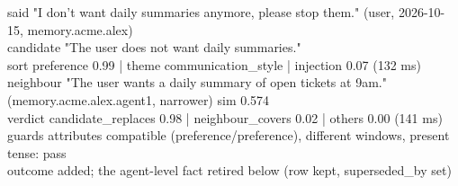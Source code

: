 \begin{tcolorbox}[enhanced,colback=titlebg,colframe=rule,arc=4pt,boxrule=0.4pt,left=6pt,right=6pt,top=4pt,bottom=4pt,
  title={\sffamily\footnotesize\bfseries An insert trace (abridged), from the organisational probe},coltitle=ink,colbacktitle=titlebg]
\footnotesize\ttfamily
said       "I don't want daily summaries anymore, please stop them."   (user, 2026-10-15, memory.acme.alex)\\
candidate  "The user does not want daily summaries."\\
sort       preference 0.99 | theme communication\_style | injection 0.07   (132 ms)\\
neighbour  "The user wants a daily summary of open tickets at 9am."  (memory.acme.alex.agent1, narrower)  sim 0.574\\
\hspace*{2em}verdict  candidate\_replaces 0.98 | neighbour\_covers 0.02 | others 0.00   (141 ms)\\
\hspace*{2em}guards   attributes compatible (preference/preference), different windows, present tense: pass\\
outcome    added; the agent-level fact retired below (row kept, superseded\_by set)
\end{tcolorbox}
